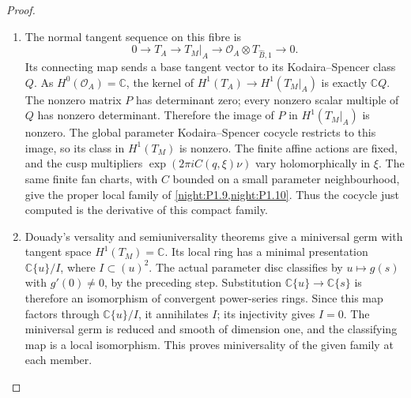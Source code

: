 \begin{proof}
\begin{enumerate}[label=\arabic*.]
\item The normal tangent sequence on this fibre is
\[
0\longrightarrow T_A\longrightarrow T_M|_A
\longrightarrow\mathcal O_A\otimes T_{\widehat B,1}
\longrightarrow0.
\]
Its connecting map sends a base tangent vector to its
Kodaira--Spencer class $Q$.  As $H^0(\mathcal O_A)=\mathbb C$,
the kernel of $H^1(T_A)\to H^1(T_M|_A)$ is exactly
$\mathbb C Q$.  The nonzero matrix $P$ has determinant zero;
every nonzero scalar multiple of $Q$ has nonzero determinant.
Therefore the image of $P$ in $H^1(T_M|_A)$ is nonzero.
The global parameter Kodaira--Spencer cocycle restricts to this
image, so its class in $H^1(T_M)$ is nonzero.
The finite affine actions are fixed, and the cusp multipliers
$\exp(2\pi iC(q,\xi)\nu)$ vary holomorphically in $\xi$.
The same finite fan charts, with $C$ bounded on a small parameter
neighbourhood, give the proper local family of
\cref{night:P1.9,night:P1.10}.  Thus the cocycle just computed is
the derivative of this compact family.

\item Douady's versality and semiuniversality theorems
\cite[\S VII.8, pp.~598--599; \S VIII.1, pp.~599--600]{Douady1974}
give a miniversal germ with tangent space $H^1(T_M)=\mathbb C$.
Its local ring has a minimal presentation $\mathbb C\{u\}/I$,
where $I\subset(u)^2$.  The actual parameter disc classifies by
$u\mapsto g(s)$ with $g'(0)\ne0$, by the preceding step.
Substitution $\mathbb C\{u\}\to\mathbb C\{s\}$ is therefore an
isomorphism of convergent power-series rings.  Since this map factors
through $\mathbb C\{u\}/I$, it annihilates $I$; its injectivity
gives $I=0$.  The miniversal germ is reduced and smooth of dimension
one, and the classifying map is a local isomorphism.  This proves
miniversality of the given family at each member.
\end{enumerate}
\end{proof}




